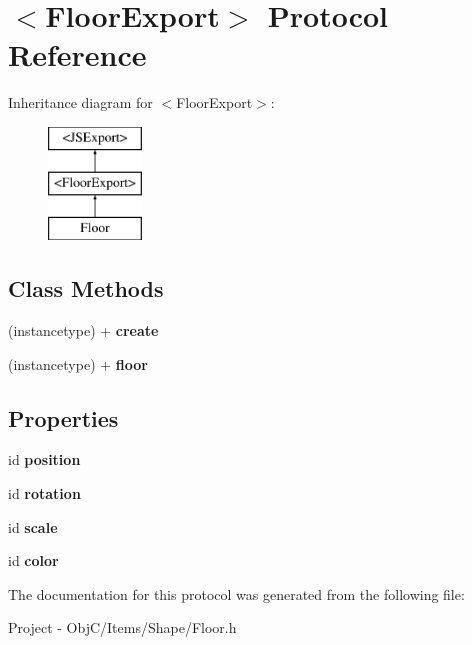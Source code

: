 \hypertarget{protocol_floor_export-p}{}\section{$<$Floor\+Export$>$ Protocol Reference}
\label{protocol_floor_export-p}
Inheritance diagram for $<$Floor\+Export$>$\+:\begin{figure}[H]
\begin{center}
\leavevmode
\includegraphics[height=3.000000cm]{protocol_floor_export-p}
\end{center}
\end{figure}
\subsection*{Class Methods}
\begin{DoxyCompactItemize}
\item 
\hypertarget{protocol_floor_export-p_ad14003cf3eb36b185c744768c8c54cdf}{}(instancetype) + {\bfseries create}\label{protocol_floor_export-p_ad14003cf3eb36b185c744768c8c54cdf}

\item 
\hypertarget{protocol_floor_export-p_a52cdb37171ab7cb02963f77a853cda74}{}(instancetype) + {\bfseries floor}\label{protocol_floor_export-p_a52cdb37171ab7cb02963f77a853cda74}

\end{DoxyCompactItemize}
\subsection*{Properties}
\begin{DoxyCompactItemize}
\item 
\hypertarget{protocol_floor_export-p_a9229440f1ebed9db03bd6e24519d308d}{}id {\bfseries position}\label{protocol_floor_export-p_a9229440f1ebed9db03bd6e24519d308d}

\item 
\hypertarget{protocol_floor_export-p_a510601e1115fe8c1fa9513cef38e0f63}{}id {\bfseries rotation}\label{protocol_floor_export-p_a510601e1115fe8c1fa9513cef38e0f63}

\item 
\hypertarget{protocol_floor_export-p_a9c5e8e882fa6fd1ef41605de1806af81}{}id {\bfseries scale}\label{protocol_floor_export-p_a9c5e8e882fa6fd1ef41605de1806af81}

\item 
\hypertarget{protocol_floor_export-p_a3f149c65e1a7664414c4e24fc0b69b44}{}id {\bfseries color}\label{protocol_floor_export-p_a3f149c65e1a7664414c4e24fc0b69b44}

\end{DoxyCompactItemize}


The documentation for this protocol was generated from the following file\+:\begin{DoxyCompactItemize}
\item 
Project -\/ Obj\+C/\+Items/\+Shape/Floor.\+h\end{DoxyCompactItemize}
